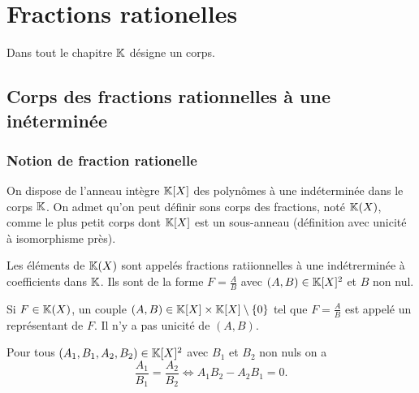 \chapter{Fractions rationelles}
\label{chap:fractionrationnelles}
\minitoc
\minilof
\minilot

Dans tout le chapitre $\mathbb{K}$ désigne un corps.

\section{Corps des fractions rationnelles à une inéterminée}

\subsection{Notion de fraction rationelle}

On dispose de l'anneau intègre $\mathbb{K}[X]$ des polynômes à une indéterminée dans le corps $\mathbb{K}$. On admet qu'on peut définir sons corps des fractions, noté $\mathbb{K}(X)$, comme le plus petit corps dont $\mathbb{K}[X]$ est un sous-anneau (définition avec unicité à isomorphisme près).

Les éléments de $\mathbb{K}(X)$ sont appelés fractions ratiionnelles à une indétrerminée à coefficients dans $\mathbb{K}$. Ils sont de la forme $F=\frac{A}{B}$ avec $(A,B) \in \mathbb{K}[X]^2$ et $B$ non nul.

Si $F \in \mathbb{K}(X)$, un couple  $(A,B) \in \mathbb{K}[X]\times \mathbb{K}[X]\setminus\{0\}$ tel que $F=\frac{A}{B}$ est appelé un représentant de $F$. Il n'y a pas unicité de $(A,B)$.

Pour tous $(A_1,B_1,A_2,B_2) \in \mathbb{K}[X]^2$ avec $B_1$ et $B_2$ non nuls on a
\begin{equation}
  \frac{A_1}{B_1} = \frac{A_2}{B_2}   \iff A_1B_2 -A_2B_1 =0.
\end{equation}

